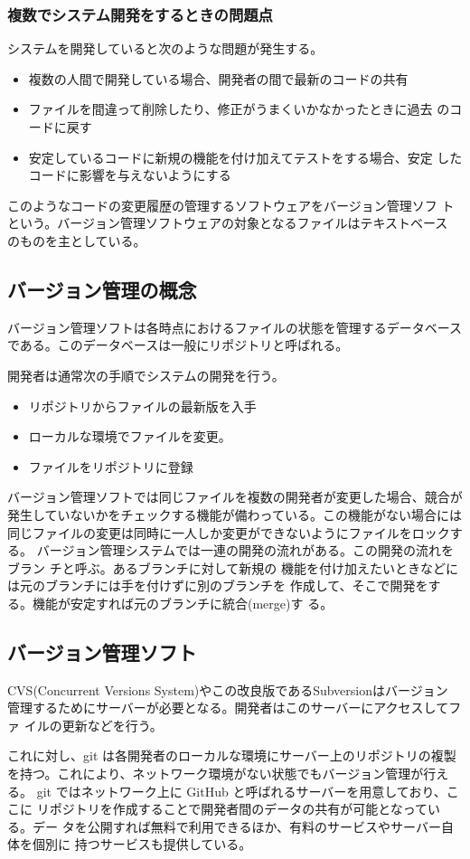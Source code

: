 \subsubsection{複数でシステム開発をするときの問題点}
システムを開発していると次のような問題が発生する。
\begin{itemize}
 \item 複数の人間で開発している場合、開発者の間で最新のコードの共有
 \item ファイルを間違って削除したり、修正がうまくいかなかったときに過去
       のコードに戻す
 \item 安定しているコードに新規の機能を付け加えてテストをする場合、安定
       したコードに影響を与えないようにする
\end{itemize}
このようなコードの変更履歴の管理するソフトウェアをバージョン管理ソフ
トという。バージョン管理ソフトウェアの対象となるファイルはテキストベース
のものを主としている。
\subsection{バージョン管理の概念}
バージョン管理ソフトは各時点におけるファイルの状態を管理するデータベース
である。このデータベースは一般にリポジトリと呼ばれる。

開発者は通常次の手順でシステムの開発を行う。
\begin{itemize}
 \item リポジトリからファイルの最新版を入手
 \item ローカルな環境でファイルを変更。
 \item ファイルをリポジトリに登録
\end{itemize}
バージョン管理ソフトでは同じファイルを複数の開発者が変更した場合、競合が
発生していないかをチェックする機能が備わっている。この機能がない場合には
同じファイルの変更は同時に一人しか変更ができないようにファイルをロックす
る。
バージョン管理システムでは一連の開発の流れがある。この開発の流れをブラン
チと呼ぶ。あるブランチに対して新規の
機能を付け加えたいときなどには元のブランチには手を付けずに別のブランチを
作成して、そこで開発をする。機能が安定すれば元のブランチに統合(merge)す
る。
\subsection{バージョン管理ソフト}
CVS(Concurrent Versions System)やこの改良版であるSubversionはバージョン
管理するためにサーバーが必要となる。開発者はこのサーバーにアクセスしてファ
イルの更新などを行う。

これに対し、git は各開発者のローカルな環境にサーバー上のリポジトリの複製
を持つ。これにより、ネットワーク環境がない状態でもバージョン管理が行える。
git ではネットワーク上に GitHub と呼ばれるサーバーを用意しており、ここに
リポジトリを作成することで開発者間のデータの共有が可能となっている。デー
タを公開すれば無料で利用できるほか、有料のサービスやサーバー自体を個別に
持つサービスも提供している。


